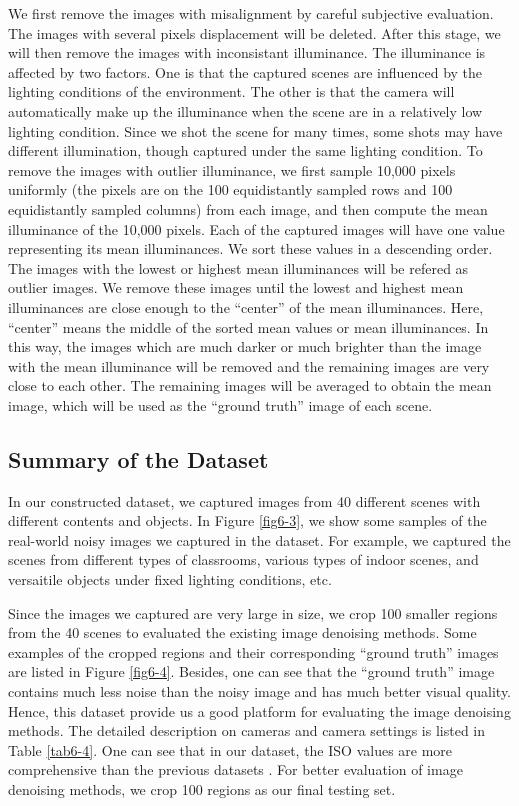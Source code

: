 We first remove the images with misalignment by careful subjective evaluation. The images with several pixels displacement will be deleted. After this stage, we will then remove the images with inconsistant illuminance. The illuminance is affected by two factors. One is that the captured scenes are influenced by the lighting conditions of the environment. The other is that the camera will automatically make up the illuminance when the scene are in a relatively low lighting condition. Since we shot the scene for many times, some shots may have different illumination, though captured under the same lighting condition. To remove the images with outlier illuminance, we first sample 10,000 pixels uniformly (the pixels are on the 100 equidistantly sampled rows and 100 equidistantly sampled columns) from each image, and then compute the mean illuminance of the 10,000 pixels. Each of the captured images will have one value representing its mean illuminances. We sort these values in a descending order. The images with the lowest or highest mean illuminances will be refered as outlier images. We remove these images until the lowest and highest mean illuminances are close enough to the ``center'' of the mean illuminances. Here, ``center'' means the middle of the sorted mean values or mean illuminances. In this way, the images which are much darker or much brighter than the image with the mean illuminance will be removed and the remaining images are very close to each other. The remaining images will be averaged to obtain the mean image, which will be used as the ``ground truth'' image of each scene.



\subsection{Summary of the Dataset}

In our constructed dataset, we captured images from 40 different scenes with different contents and objects. In Figure \ref{fig6-3}, we show some samples of the real-world noisy images we captured in the dataset. For example, we captured the scenes from different types of classrooms, various types of indoor scenes, and versaitile objects under fixed lighting conditions, etc.


Since the images we captured are very large in size, we crop 100 smaller regions from the 40 scenes to evaluated the existing image denoising methods. Some examples of the cropped regions and their corresponding ``ground truth'' images are listed in Figure \ref{fig6-4}. Besides, one can see that the ``ground truth'' image contains much less noise than the noisy image and has much better visual quality. Hence, this dataset provide us a good platform for evaluating the image denoising methods. The detailed description on cameras and camera settings is listed in Table \ref{tab6-4}. One can see that in our dataset, the ISO values are more comprehensive than the previous datasets \cite{RENOIR2014,crosschannel2016,dnd2017}. For better evaluation of image denoising methods, we crop 100 regions as our final testing set.

